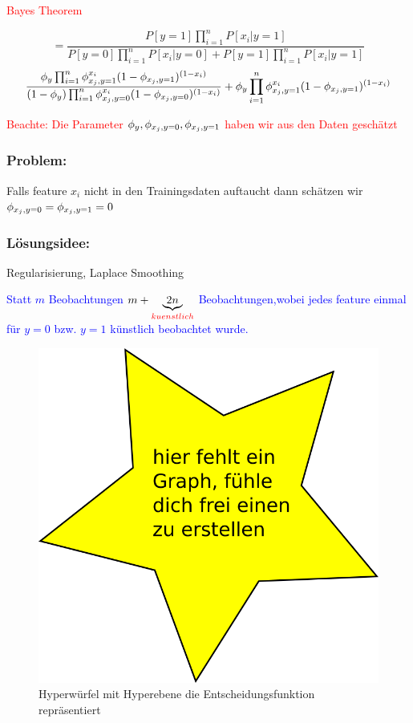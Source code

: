 		\textcolor{red}{Bayes Theorem}
		
		\[ = \frac{P[y = 1] \prod_{i = 1}^{n} P[x_i | y = 1]}{P[y = 0] \prod_{i = 1}^{n} P[x_i | y = 0] + P[y = 1] \prod_{i = 1}^{n} P[x_i | y = 1] }\]
		\[ \frac{\phi_y \prod_{i = 1}^{n} \phi_{x_j, y=1}^{x_i}(1- \phi_{x_j, y=1})^{(1-x_i)}}{(1 - \phi_y) \prod_{i = 1}^{n} \phi_{x_j, y=0}^{x_i}(1- \phi_{x_j, y=0})^{(1-x_i)}} + \phi_y \prod_{i = 1}^{n} \phi_{x_j, y=1}^{x_i}(1- \phi_{x_j, y=1})^{(1-x_i)} \]
		
		\textcolor{red}{Beachte: Die Parameter $ \phi_y, \phi_{x_j, y=0}, \phi_{x_j, y=1} $ haben wir aus den Daten geschätzt}	
	
	\subsubsection*{Problem:}
		
		Falls feature $ x_i $ nicht in den Trainingsdaten auftaucht dann schätzen wir $ \phi_{x_j, y=0} = \phi_{x_j, y=1} = 0  $
	
	\subsubsection*{Lösungsidee:}
		
		Regularisierung, Laplace Smoothing
		
		\textcolor{blue}{Statt $ m $ Beobachtungen $ m + \underbrace{2n}_{\substack{\textcolor{red}{kuenstlich}}} $ Beobachtungen,wobei jedes feature einmal für $ y = 0 $ bzw. $ y = 1 $ künstlich beobachtet wurde.}
		
			\begin{figure}
				\centering
				\includegraphics[width=0.7\linewidth]{graphs/dummy}
				\caption{Hyperwürfel mit Hyperebene die Entscheidungsfunktion repräsentiert}
			\end{figure}
		

